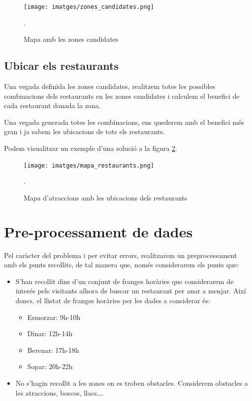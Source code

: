 \documentclass[12pt]{article}
\begin{document}
\begin{figure}[H]
	\centering
	\texttt{[image: imatges/zones\_candidates.png]}\par\vspace{1cm}
	\caption{Mapa amb les zones candidates}.
	\label{fig:zones_candidates}
\end{figure}

\subsection{Ubicar els restaurants}

Una vegada definida les zones candidates, realitzem totes les possibles combinacions dels restaurants en les zones candidates i calculem el benefici de cada restaurant donada la zona. 

Una vegada generada totes les combinacions, ens quederem amb el benefici més gran i ja sabem les ubicacions de tots els restaurants.

Podem visualitzar un exemple d'una solució a la figura \ref{fig:mapa_restaurants}.

\begin{figure}[H]
	\centering
	\texttt{[image: imatges/mapa\_restaurants.png]}\par\vspace{1cm}
	\caption{Mapa d'atraccions amb les ubicacions dels restaurants}.
	\label{fig:mapa_restaurants}
\end{figure}


\section{Pre-processament de dades}
Pel caràcter del problema i per evitar errors, realitzarem un preprocessament amb els punts recollits, de tal manera que, només considerarem els punts que:
\begin{itemize}
	\item S’han recollit dins d’un conjunt de franges horàries que considerarem de interés pels visitants alhora de buscar un restaurant per anar a menjar. 
	Així doncs, el llistat de franges horàries per les dades a considerar és:
	\begin{itemize}
		\item Esmorzar: 9h-10h
		\item Dinar: 12h-14h
		\item Berenar: 17h-18h
		\item Sopar: 20h-22h
	\end{itemize}

	\item No s’hagin recollit a les zones on es troben obstacles. 
	Considerem obstacles a les atraccions, boscos, llacs….
\end{itemize}
\end{document}
